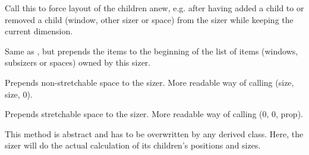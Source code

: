 Call this to force layout of the children anew, e.g. after having added a child
to or removed a child (window, other sizer or space) from the sizer while keeping
the current dimension.


\label{wxsizerprepend}






Same as , but prepends the items to the beginning of the
list of items (windows, subsizers or spaces) owned by this sizer.


\label{wxsizerprependspacer}


Prepends non-stretchable space to the sizer. More readable way of calling
(size, size, 0).


\label{wxsizerprependstretchspacer}


Prepends stretchable space to the sizer. More readable way of calling
(0, 0, prop).


\label{wxsizerrecalcsizes}


This method is abstract and has to be overwritten by any derived class.
Here, the sizer will do the actual calculation of its children's positions
and sizes.


\label{wxsizerremove}

